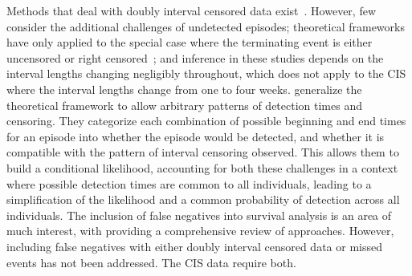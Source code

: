 \documentclass[referee,useAMS,usenatbib]{biom}
\newcommand\citePersonalComms[1]{(#1, personal communication)}
\begin{document}
Methods that deal with doubly interval censored data exist~\citep{sunStatistical,bogaertsSurvival}.
However, few consider the additional challenges of undetected episodes;
theoretical frameworks~\citep{turnbullEmpirical,dempsterMaximum} have only applied to the special case where the terminating event is either uncensored or right censored~\citep[e.g.][]{sunEmpirical,bacchettiNonparametric,shenNonparametric}; and
inference in these studies depends on the interval lengths changing negligibly throughout, which does not apply to the CIS where the interval lengths change from one to four weeks. %
\citet{heiseyModelling} generalize the theoretical framework to allow arbitrary patterns of detection times and censoring.
They categorize each combination of possible beginning and end times for an episode into whether the episode would be detected, and whether it is compatible with the pattern of interval censoring observed.
This allows them to build a conditional likelihood, accounting for both these challenges in a context where possible detection times are common to all individuals, leading to a simplification of the likelihood and a common probability of detection across all individuals.
The inclusion of false negatives into survival analysis is an area of much interest, with
\citet{piresIntervalMisclassify} providing a comprehensive review of approaches. However, including false negatives with either doubly interval censored data or missed events has not been addressed. The CIS data require both.
\end{document}
